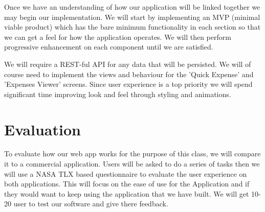\documentclass{chi2011}
\begin{document}
Once we have an understanding of how our application will be linked together we
may begin our implementation. We will start by implementing an MVP (minimal
viable product) which has the bare minimum functionality in each section so that
we can get a feel for how the application operates. We will then perform
progressive enhancement on each component until we are satisfied.

We will require a REST-ful API for any data that will be persisted. We will of
course need to implement the views and behaviour for the 'Quick Expense' and
'Expenses Viewer' screens. Since user experience is a top priority we will spend
significant time improving look and feel through styling and animations.

\section{Evaluation}
To evaluate how our web app works for the purpose of this class, we will compare
it to a commercial application. Users will be asked to do a series of tasks then
we will use a NASA TLX based questionnaire to evaluate the user experience on
both applications. This will focus on the ease of use for the Application and
if they would want to keep using the application that we have built. We will get
10-20 user to test our software and give there feedback.  


\end{document}
